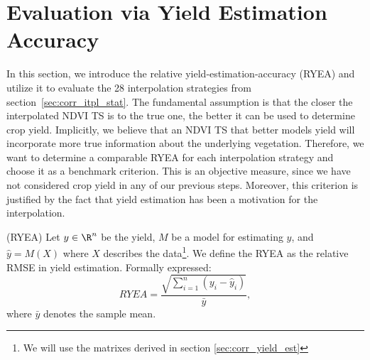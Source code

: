 \section{Evaluation via Yield Estimation Accuracy}{
    \label{sec:ndvi_corr_eval}
    In this section, we introduce the relative yield-estimation-accuracy ({RYEA}) and utilize it to evaluate the 28 interpolation strategies from section~\ref{sec:corr_itpl_stat}. 
    The fundamental assumption is that the closer the interpolated NDVI {TS} is to the true one, the better it can be used to determine crop yield. Implicitly, we believe that an NDVI {TS} that better models yield will incorporate more true information about the underlying vegetation. 
    Therefore, we want to determine a comparable RYEA for each interpolation strategy and choose it as a benchmark criterion. 
    This is an objective measure, since we have not considered crop yield in any of our previous steps. Moreover, this criterion is justified by the fact that yield estimation has been a motivation for the interpolation.

    \begin{definition}(RYEA) \label{def:ryea}
        Let $y\in \R^n$ be the yield, $M$ be a model for estimating $y$, and $\hat y = M(X)$ where $X$ describes the data\footnote{We will use the matrixes derived in section \ref{sec:corr_yield_est}}. 
        We define the RYEA as the relative RMSE in yield estimation. Formally expressed:
        \begin{equation}
            RYEA = \frac{\sqrt{\sum_{i=1}^n(y_i - \hat y_i)}}{\bar y}, %
        \end{equation}
        where $\bar y$ denotes the sample mean.
    \end{definition}

}
